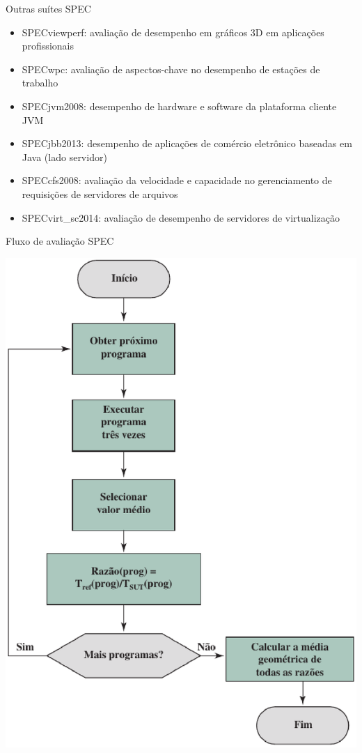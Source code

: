 \begin{slide}{Outras suítes SPEC}
\begin{itemize}
	\item SPECviewperf: avaliação de desempenho em gráficos 3D em aplicações profissionais
	\item SPECwpc: avaliação de aspectos-chave no desempenho de estações de trabalho
	\item SPECjvm2008: desempenho de hardware e software da plataforma cliente JVM
        \item SPECjbb2013: desempenho de aplicações de comércio eletrônico baseadas em Java (lado servidor)
        \item SPECcfs2008: avaliação da velocidade e capacidade no gerenciamento de requisições de servidores de arquivos
        \item SPECvirt\_sc2014: avaliação de desempenho de servidores de virtualização
\end{itemize}
\end{slide}

\begin{slide}{Fluxo de avaliação SPEC}
	\begin{center}
		\includegraphics[height = 0.8\textheight]{figs/fluxo-spec}
	\end{center}
\end{slide}


